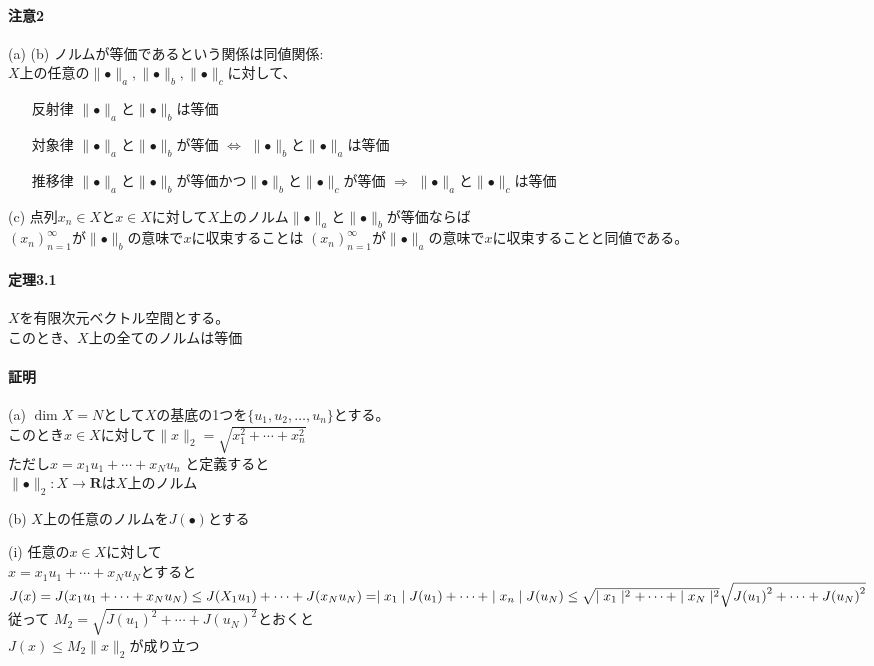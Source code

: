 \documentclass[12pt,a4paper]{article}
\begin{document}
    \paragraph{注意2}
      (a) (b) ノルムが等価であるという関係は同値関係: \\
      $X$上の任意の$\parallel\bullet\parallel_a, \parallel\bullet\parallel_b, \parallel\bullet\parallel_c$に対して、
      \begin{itemize}
        \item[反射律] $\parallel\bullet\parallel_a$と$\parallel\bullet\parallel_b$は等価
        \item[対象律] $\parallel\bullet\parallel_a$と$\parallel\bullet\parallel_b$が等価 $\Leftrightarrow$ $\parallel\bullet\parallel_b$と$\parallel\bullet\parallel_a$は等価
        \item[推移律] $\parallel\bullet\parallel_a$と$\parallel\bullet\parallel_b$が等価かつ$\parallel\bullet\parallel_b$と$\parallel\bullet\parallel_c$が等価 $\Rightarrow$ $\parallel\bullet\parallel_a$と$\parallel\bullet\parallel_c$は等価
      \end{itemize}
      (c) 点列$x_n \in X$と$x \in X$に対して$X$上のノルム$\parallel\bullet\parallel_a$と$\parallel\bullet\parallel_b$が等価ならば\\
      ${(x_n)}_{n=1}^\infty$が$\parallel\bullet\parallel_b$の意味で$x$に収束することは
      ${(x_n)}_{n=1}^\infty$が$\parallel\bullet\parallel_a$の意味で$x$に収束することと同値である。
    \paragraph{定理3.1}
      $X$を有限次元ベクトル空間とする。\\
      このとき、$X$上の全てのノルムは等価
    \paragraph{証明}
    (a) $\dim X = N$として$X$の基底の1つを$\lbrace u_1, u_2, \ldots, u_n \rbrace$とする。\\
      このとき$x \in X$に対して$\parallel x \parallel_2 = \sqrt{x_1^2 + \cdots + x_n^2}$\\
      ただし$x = x_1 u_1 + \cdots + x_N u_n$
      と定義すると\\
      $\parallel \bullet \parallel_2 : X \rightarrow \mathbf{R}$は$X$上のノルム
    
    (b) $X$上の任意のノルムを$J(\bullet)$とする
    
    (i) 任意の$x \in X$に対して\\
    $x = x_1 u_1 + \cdots + x_N u_N$とすると\\
    $J(x) = J(x_1 u_1 + \cdots + x_N u_N) \\
     \leq J(X_1 u_1) + \cdots + J(x_N u_N) \\
     = \mid x_1 \mid J(u_1) + \cdots + \mid x_n \mid J(u_N) \\
     \leq \sqrt{\mid x_1 \mid^2 + \cdots + \mid x_N \mid^2} \sqrt{J{(u_1)}^2 + \cdots + J{(u_N)}^2}$ \\
     従って $M_2 = \sqrt{J{(u_1)}^2 + \cdots + J{(u_N)}^2}$とおくと \\
     $J(x)\leq M_2 \parallel x \parallel_2$が成り立つ
    
\end{document}
